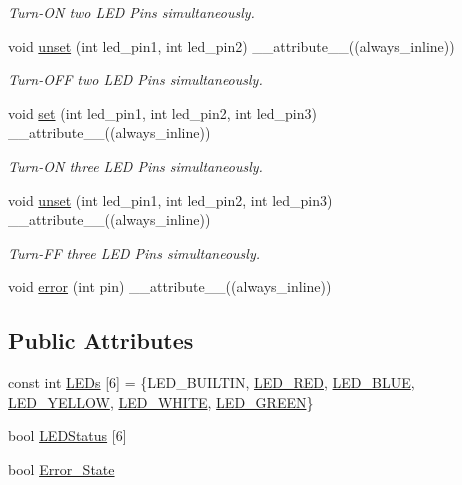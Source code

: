 \begin{DoxyCompactItemize}
\begin{DoxyCompactList}\small\item\em Turn-\/\+ON two L\+ED Pins simultaneously. \end{DoxyCompactList}\item 
void \hyperlink{classLEDSet_a32c76a9ee5328ed6b6c167b4ce8578c9}{unset} (int led\+\_\+pin1, int led\+\_\+pin2) \+\_\+\+\_\+attribute\+\_\+\+\_\+((always\+\_\+inline))
\begin{DoxyCompactList}\small\item\em Turn-\/\+O\+FF two L\+ED Pins simultaneously. \end{DoxyCompactList}\item 
void \hyperlink{classLEDSet_ae2b77e5323305d3598c33e45e14c8cb4}{set} (int led\+\_\+pin1, int led\+\_\+pin2, int led\+\_\+pin3) \+\_\+\+\_\+attribute\+\_\+\+\_\+((always\+\_\+inline))
\begin{DoxyCompactList}\small\item\em Turn-\/\+ON three L\+ED Pins simultaneously. \end{DoxyCompactList}\item 
void \hyperlink{classLEDSet_a23a820fbb738a3ba1c6e2b454d20ac68}{unset} (int led\+\_\+pin1, int led\+\_\+pin2, int led\+\_\+pin3) \+\_\+\+\_\+attribute\+\_\+\+\_\+((always\+\_\+inline))
\begin{DoxyCompactList}\small\item\em Turn-\/\+FF three L\+ED Pins simultaneously. \end{DoxyCompactList}\item 
void \hyperlink{classLEDSet_aee9276cba956882a006f7cdd6124e487}{error} (int pin) \+\_\+\+\_\+attribute\+\_\+\+\_\+((always\+\_\+inline))
\end{DoxyCompactItemize}
\subsection*{Public Attributes}
\begin{DoxyCompactItemize}
\item 
const int \hyperlink{classLEDSet_a6d83c4cf19c09eb8fdb2a6724a8df99e}{L\+E\+Ds} \mbox{[}6\mbox{]} = \{L\+E\+D\+\_\+\+B\+U\+I\+L\+T\+IN, \hyperlink{pins_8hpp_a735f426a390e22c0050b964328c5e06f}{L\+E\+D\+\_\+\+R\+ED}, \hyperlink{pins_8hpp_a8046eca6ddcbe578777cfde489622a13}{L\+E\+D\+\_\+\+B\+L\+UE}, \hyperlink{pins_8hpp_af338796c804fbfe2e9fd4d249e3c5004}{L\+E\+D\+\_\+\+Y\+E\+L\+L\+OW}, \hyperlink{pins_8hpp_a1be903f86639d50fb6ed02a0dbbe0e2c}{L\+E\+D\+\_\+\+W\+H\+I\+TE}, \hyperlink{pins_8hpp_a8d7df4222b2fde6205bebffc5a0ae070}{L\+E\+D\+\_\+\+G\+R\+E\+EN}\}
\item 
bool \hyperlink{classLEDSet_a54945652a2ba428b70ad620e88b4ab60}{L\+E\+D\+Status} \mbox{[}6\mbox{]}
\item 
bool \hyperlink{classLEDSet_aed8105506190d87caa13c36174aa31bd}{Error\+\_\+\+State}
\end{DoxyCompactItemize}
